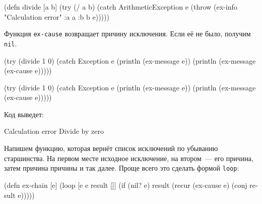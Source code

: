 
\label{re-throw-example}

\begin{english}
  \begin{clojure}
(defn divide [a b]
  (try
    (/ a b)
    (catch ArithmeticException e
      (throw (ex-info
               "Calculation error"
               {:a a :b b}
               e)))))
  \end{clojure}
\end{english}

Функция \verb|ex-cause| возвращает причину исключения. Если её не было,
получим \verb|nil|.

\ifx\devicetype\mobile

\begin{english}
  \begin{clojure}
(try
  (divide 1 0)
  (catch Exception e
    (println (ex-message e))
    (println (ex-message
               (ex-cause e)))))
  \end{clojure}
\end{english}

\else

\begin{english}
  \begin{clojure}
(try
  (divide 1 0)
  (catch Exception e
    (println (ex-message e))
    (println (ex-message (ex-cause e)))))
  \end{clojure}
\end{english}

\fi

\noindent
Код выведет:

\begin{english}
  \begin{text}
Calculation error
Divide by zero
  \end{text}
\end{english}

Напишем функцию, которая вернёт список исключений по убыванию
старшинства. На первом месте исходное исключение, на втором~--- его причина, затем
причина причины и так далее. Проще всего это сделать формой \verb|loop|:


\ifx\devicetype\mobile

\begin{english}
  \begin{clojure}
(defn ex-chain [e]
  (loop [e e
         result []]
    (if (nil? e)
      result
      (recur (ex-cause e)
        (conj result e)))))
  \end{clojure}
\end{english}

